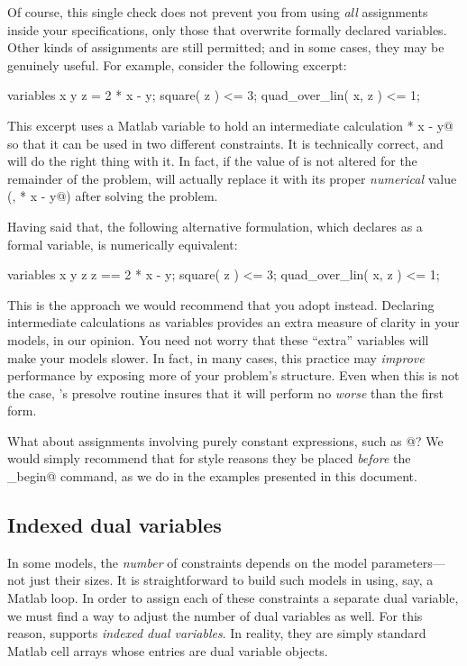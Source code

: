 \documentclass[12pt]{article}
\begin{document}
Of course, this single check does not prevent you from using \emph{all} assignments 
inside your \cvx specifications, only those that overwrite formally declared variables.
Other kinds of assignments are still permitted; and in some cases, they may be genuinely
useful. For example, consider the following \cvx excerpt:
\begin{code}
	variables x y
	z = 2 * x - y;
	square( z ) <= 3;
	quad_over_lin( x, z ) <= 1;
\end{code}
This excerpt uses a Matlab variable \verb@z@ to hold an
intermediate calculation  * x - y@ so that it can be used in two different constraints.
It is technically correct, and \cvx will do the right thing with it. In fact, if the value
of \verb@z@ is not altered for the remainder of the problem, \cvx will actually replace it
with its proper \emph{numerical} value (\ie,  * x - y@) after solving the problem.

Having said that, the following alternative formulation, which declares \verb@z@
as a formal variable, is numerically equivalent:
\begin{code}
	variables x y z
	z == 2 * x - y;
	square( z ) <= 3;
	quad_over_lin( x, z ) <= 1;
\end{code}
This is the approach we would recommend that you adopt instead. Declaring intermediate
calculations as variables provides an extra measure of clarity in your models, in our
opinion. You need not worry that these ``extra'' variables will make your models slower. 
In fact, in many cases, this
practice may \emph{improve} performance by exposing more of your problem's structure.
Even when this is not the case, \cvx's presolve routine insures that it will perform
no \emph{worse} than the first form.

What about assignments involving purely constant expressions, such as @?
We would simply recommend that for style reasons they be placed \emph{before}
the \verb@cvx_begin@ command, as we do in the examples presented in this document.

\subsection{Indexed dual variables}
\label{sec:indexeddual}

In some models, the \emph{number} of constraints depends on the model
parameters---not just their sizes. It is
straightforward to build such models in \cvx using, say, a
Matlab \verb@for@ loop. In order to assign each of these constraints
a separate dual variable, we must find a way to adjust the number of
dual variables as well. For this reason, \cvx supports
\emph{indexed dual variables}. In reality, they are simply standard
Matlab cell arrays whose entries are \cvx dual variable objects.
\end{document}
